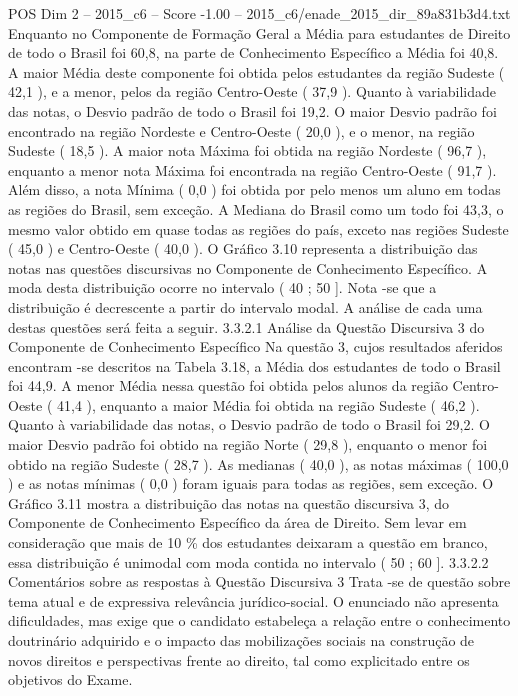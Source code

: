 \begin{textsample}{POS Dim 2 – 2015\_c6 – Score -1.00 – 2015\_c6/enade\_2015\_dir\_89a831b3d4.txt}
Enquanto no Componente de Formação Geral a Média para estudantes de Direito de todo o Brasil foi 60,8, na parte de Conhecimento Específico a Média foi 40,8.
A maior Média deste componente foi obtida pelos estudantes da região Sudeste ( 42,1 ), e a menor, pelos da região Centro-Oeste ( 37,9 ).
Quanto à variabilidade das notas, o Desvio padrão de todo o Brasil foi 19,2.
O maior Desvio padrão foi encontrado na região Nordeste e Centro-Oeste ( 20,0 ), e o menor, na região Sudeste ( 18,5 ).
A maior nota Máxima foi obtida na região Nordeste ( 96,7 ), enquanto a menor nota Máxima foi encontrada na região Centro-Oeste ( 91,7 ).
Além disso, a nota Mínima ( 0,0 ) foi obtida por pelo menos um aluno em todas as regiões do Brasil, sem exceção.
A Mediana do Brasil como um todo foi 43,3, o mesmo valor obtido em quase todas as regiões do país, exceto nas regiões Sudeste ( 45,0 ) e Centro-Oeste ( 40,0 ).
O Gráfico 3.10 representa a distribuição das notas nas questões discursivas no Componente de Conhecimento Específico.
A moda desta distribuição ocorre no intervalo ( 40 ; 50 ].
Nota -se que a distribuição é decrescente a partir do intervalo modal.
A análise de cada uma destas questões será feita a seguir. 3.3.2.1 Análise da Questão Discursiva 3 do Componente de Conhecimento Específico Na questão 3, cujos resultados aferidos encontram -se descritos na Tabela 3.18, a Média dos estudantes de todo o Brasil foi 44,9.
A menor Média nessa questão foi obtida pelos alunos da região Centro-Oeste ( 41,4 ), enquanto a maior Média foi obtida na região Sudeste ( 46,2 ).
Quanto à variabilidade das notas, o Desvio padrão de todo o Brasil foi 29,2.
O maior Desvio padrão foi obtido na região Norte ( 29,8 ), enquanto o menor foi obtido na região Sudeste ( 28,7 ).
As medianas ( 40,0 ), as notas máximas ( 100,0 ) e as notas mínimas ( 0,0 ) foram iguais para todas as regiões, sem exceção.
O Gráfico 3.11 mostra a distribuição das notas na questão discursiva 3, do Componente de Conhecimento Específico da área de Direito.
Sem levar em consideração que mais de 10 \% dos estudantes deixaram a questão em branco, essa distribuição é unimodal com moda contida no intervalo ( 50 ; 60 ]. 3.3.2.2 Comentários sobre as respostas à Questão Discursiva 3 Trata -se de questão sobre tema atual e de expressiva relevância jurídico-social.
O enunciado não apresenta dificuldades, mas exige que o candidato estabeleça a relação entre o conhecimento doutrinário adquirido e o impacto das mobilizações sociais na construção de novos direitos e perspectivas frente ao direito, tal como explicitado entre os objetivos do Exame.

\end{textsample}
